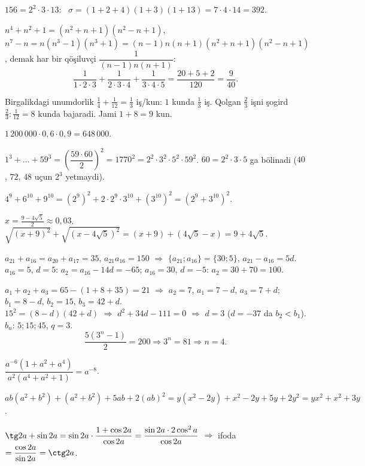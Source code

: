 




$156=2^2\cdot3\cdot13$: \ $\sigma=(1+2+4)(1+3)(1+13)=7\cdot4\cdot14=392$.

$n^4+n^2+1=(n^2+n+1)(n^2-n+1)$, \ $n^7-n=n(n^3-1)(n^3+1)=(n-1)n(n+1)(n^2+n+1)(n^2-n+1)$, demak har bir qöşiluvçi $\dfrac1{(n-1)n(n+1)}$:
\[\frac1{1\cdot2\cdot3}+\frac1{2\cdot3\cdot4}+\frac1{3\cdot4\cdot5}=\frac{20+5+2}{120}=\frac9{40}.\]

Birgalikdagi unumdorlik $\frac14+\frac1{12}=\frac13$ iş/kun: $1$ kunda $\frac13$ iş. Qolgan $\frac23$ işni şogird $\frac23:\frac1{12}=8$ kunda bajaradi. Jami $1+8=9$ kun.

$1\,200\,000\cdot0{,}6\cdot0{,}9=648\,000$.

$1^3+\dots+59^3=\left(\dfrac{59\cdot60}2\right)^2=1770^2=2^2\cdot3^2\cdot5^2\cdot59^2$. $60=2^2\cdot3\cdot5$ ga bölinadi ($40$, $72$, $48$ uçun $2^3$ yetmaydi).

$4^9+6^{10}+9^{10}=\left(2^9\right)^2+2\cdot2^9\cdot3^{10}+\left(3^{10}\right)^2=\left(2^9+3^{10}\right)^2$.

$x=\frac{9-4\sqrt5}2\approx0{,}03$. \ $\sqrt{(x+9)^2}+\sqrt{(x-4\sqrt5)^2}=(x+9)+(4\sqrt5-x)=9+4\sqrt5$.

$a_{21}+a_{16}=a_{20}+a_{17}=35$, $a_{21}a_{16}=150$ $\Rightarrow$ $\{a_{21};a_{16}\}=\{30;5\}$, $a_{21}-a_{16}=5d$.\\
$a_{16}=5$, $d=5$: $a_2=a_{16}-14d=-65$; \quad $a_{16}=30$, $d=-5$: $a_2=30+70=100$.

$a_1+a_2+a_3=65-(1+8+35)=21$ $\Rightarrow$ $a_2=7$, $a_1=7-d$, $a_3=7+d$; \ $b_1=8-d$, $b_2=15$, $b_3=42+d$.\\
$15^2=(8-d)(42+d)$ $\Rightarrow$ $d^2+34d-111=0$ $\Rightarrow$ $d=3$ ($d=-37$ da $b_2<b_1$). $b_n$: $5;15;45$, $q=3$.
\[\frac{5(3^n-1)}2=200\Rightarrow3^n=81\Rightarrow n=4.\]

$\dfrac{a^{-6}\left(1+a^2+a^4\right)}{a^2\left(a^4+a^2+1\right)}=a^{-8}$.

$ab(a^2+b^2)+(a^2+b^2)+5ab+2(ab)^2=y(x^2-2y)+x^2-2y+5y+2y^2=yx^2+x^2+3y$.

$\tg2a+\sin2a=\sin2a\cdot\dfrac{1+\cos2a}{\cos2a}=\dfrac{\sin2a\cdot2\cos^2a}{\cos2a}$ $\Rightarrow$ ifoda $=\dfrac{\cos2a}{\sin2a}=\ctg2a$.

